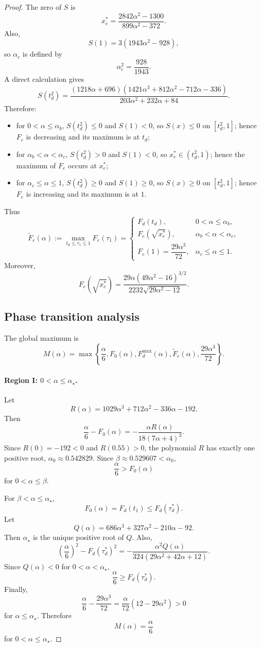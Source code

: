 \documentclass[10pt,a4paper]{amsart}
\numberwithin{equation}{section}
\begin{document}
\begin{proof}
The zero of $S$ is
\[
x_e^*
=
\frac{2842\alpha^2-1300}{899\alpha^2-372}.
\]
Also,
\[
S(1)
=
3(1943\alpha^2-928),
\]
so $\alpha_c$ is defined by
\[
\alpha_c^2=\frac{928}{1943}.
\]
A direct calculation gives
\[
S(t_d^2)
=
\frac{
(1218\alpha+696)
(1421\alpha^3+812\alpha^2-712\alpha-336)
}
{203\alpha^2+232\alpha+84}.
\]
Therefore:
\begin{itemize}
\item for $0<\alpha\le\alpha_b$, $S(t_d^2)\le0$ and $S(1)<0$, so $S(x)\le0$ on $[t_d^2,1]$; hence $F_e$ is decreasing and its maximum is at $t_d$;
\item for $\alpha_b<\alpha<\alpha_c$, $S(t_d^2)>0$ and $S(1)<0$, so $x_e^*\in(t_d^2,1)$; hence the maximum of $F_e$ occurs at $x_e^*$;
\item for $\alpha_c\le\alpha\le1$, $S(t_d^2)\ge0$ and $S(1)\ge0$, so $S(x)\ge0$ on $[t_d^2,1]$; hence $F_e$ is increasing and its maximum is at $1$.
\end{itemize}
Thus
\[
\widetilde F_e(\alpha)
:=
\max_{t_d\le \tau_1\le1} F_e(\tau_1)
=
\begin{cases}
F_d(t_d), & 0<\alpha\le\alpha_b,\\[6pt]
F_e(\sqrt{x_e^*}), & \alpha_b<\alpha<\alpha_c,\\[6pt]
F_e(1)=\dfrac{29\alpha^3}{72}, & \alpha_c\le\alpha\le1.
\end{cases}
\]
Moreover,
\[
F_e(\sqrt{x_e^*})
=
\frac{29\alpha(49\alpha^2-16)^{3/2}}
{2232\sqrt{29\alpha^2-12}}.
\]

\subsection*{Phase transition analysis}

The global maximum is
\[
M(\alpha)
=
\max\left\{
\frac{\alpha}{6},
F_0(\alpha),
F_d^{\max}(\alpha),
\widetilde F_e(\alpha),
\frac{29\alpha^3}{72}
\right\}.
\]

\paragraph{Region I: $0<\alpha\le\alpha_\star$.}
Let
\[
R(\alpha)
=
1029\alpha^3+712\alpha^2-336\alpha-192.
\]
Then
\[
\frac{\alpha}{6}-F_0(\alpha)
=
-\frac{\alpha R(\alpha)}{18(7\alpha+4)^3}.
\]
Since $R(0)=-192<0$ and $R(0.55)>0$, the polynomial $R$ has exactly one positive root, $\alpha_0\approx 0.542829$. Since $\beta\approx 0.529607<\alpha_0$,
\[
\frac{\alpha}{6}>F_0(\alpha)
\]
for $0<\alpha\le\beta$.

For $\beta<\alpha\le\alpha_\star$,
\[
F_0(\alpha)=F_d(t_1)\le F_d(\tau_d^*).
\]
Let
\[
Q(\alpha)
=
686\alpha^3+327\alpha^2-210\alpha-92.
\]
Then $\alpha_\star$ is the unique positive root of $Q$. Also,
\[
\left(\frac{\alpha}{6}\right)^2
-
F_d(\tau_d^*)^2
=
-\frac{\alpha^2 Q(\alpha)}
{324(29\alpha^2+42\alpha+12)}.
\]
Since $Q(\alpha)<0$ for $0<\alpha<\alpha_\star$,
\[
\frac{\alpha}{6}\ge F_d(\tau_d^*).
\]
Finally,
\[
\frac{\alpha}{6}
-
\frac{29\alpha^3}{72}
=
\frac{\alpha}{72}(12-29\alpha^2)>0
\]
for $\alpha\le\alpha_\star$. Therefore
\[
M(\alpha)=\frac{\alpha}{6}
\]
for $0<\alpha\le\alpha_\star$.


\end{proof}
\end{document}

